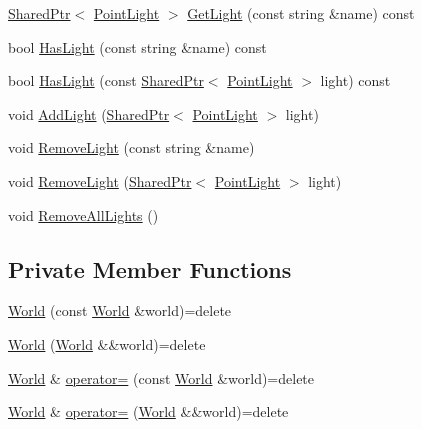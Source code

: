 \begin{DoxyCompactItemize}
\hyperlink{namespacemage_a1e01ae66713838a7a67d30e44c67703e}{Shared\+Ptr}$<$ \hyperlink{classmage_1_1_point_light}{Point\+Light} $>$ \hyperlink{classmage_1_1_world_ac7c1a382b10e67bd42493af3966c9212}{Get\+Light} (const string \&name) const
\item 
bool \hyperlink{classmage_1_1_world_af83318e3810a5658aa37285df708aa81}{Has\+Light} (const string \&name) const
\item 
bool \hyperlink{classmage_1_1_world_ac76eb3df75c68ec28b7a9db9b0576171}{Has\+Light} (const \hyperlink{namespacemage_a1e01ae66713838a7a67d30e44c67703e}{Shared\+Ptr}$<$ \hyperlink{classmage_1_1_point_light}{Point\+Light} $>$ light) const
\item 
void \hyperlink{classmage_1_1_world_ab0c31d3113ea264fed8b8ef034047c91}{Add\+Light} (\hyperlink{namespacemage_a1e01ae66713838a7a67d30e44c67703e}{Shared\+Ptr}$<$ \hyperlink{classmage_1_1_point_light}{Point\+Light} $>$ light)
\item 
void \hyperlink{classmage_1_1_world_a06f60650aa7992f44167043d1aa2e576}{Remove\+Light} (const string \&name)
\item 
void \hyperlink{classmage_1_1_world_ab2bca0a737500b2d78b39e6cbafd61d0}{Remove\+Light} (\hyperlink{namespacemage_a1e01ae66713838a7a67d30e44c67703e}{Shared\+Ptr}$<$ \hyperlink{classmage_1_1_point_light}{Point\+Light} $>$ light)
\item 
void \hyperlink{classmage_1_1_world_a5fafe529414d511e88b98ccd8e2f951f}{Remove\+All\+Lights} ()
\end{DoxyCompactItemize}
\subsection*{Private Member Functions}
\begin{DoxyCompactItemize}
\item 
\hyperlink{classmage_1_1_world_a28e20e33499cd57282cefa5ab0fda041}{World} (const \hyperlink{classmage_1_1_world}{World} \&world)=delete
\item 
\hyperlink{classmage_1_1_world_a29c5740a1fc3bfd7f05c6692257d17ff}{World} (\hyperlink{classmage_1_1_world}{World} \&\&world)=delete
\item 
\hyperlink{classmage_1_1_world}{World} \& \hyperlink{classmage_1_1_world_aa7074e3847c9fbe1466aa833f194eed0}{operator=} (const \hyperlink{classmage_1_1_world}{World} \&world)=delete
\item 
\hyperlink{classmage_1_1_world}{World} \& \hyperlink{classmage_1_1_world_a0440e945dfd0291174ce6dc33e5d8335}{operator=} (\hyperlink{classmage_1_1_world}{World} \&\&world)=delete
\end{DoxyCompactItemize}
